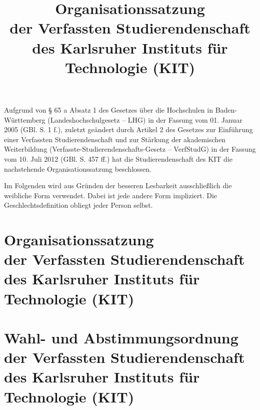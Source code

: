 \documentclass[
	a4paper,
	parskip=half,
	numbers=noenddot,
	titlepage,
	DIV=12,
]{scrartcl}
\title{Organisationssatzung \\ der Verfassten Studierendenschaft \\ des Karlsruher Instituts für Technologie (KIT)}
\author{}
\date{}
\begin{document}
\maketitle

\cleardoublepage

\begin{multicols}{2}
\tableofcontents
\end{multicols}

\bigskip

Aufgrund von § 65 a Absatz 1 des Gesetzes über die Hochschulen in Baden-Württemberg (Landeshochschulgesetz -- LHG) in der Fassung vom 01. Januar 2005 (GBl. S. 1 f.), zuletzt geändert durch Artikel 2 des Gesetzes zur Einführung einer Verfassten Studierendenschaft und zur Stärkung der akademischen Weiterbildung (Verfasste-Studierendenschafts-Gesetz -- VerfStudG) in der Fassung vom 10. Juli 2012 (GBl. S. 457 ff.) hat die Studierendenschaft des KIT die nachstehende Organisationssatzung beschlossen.

Im Folgenden wird aus Gründen der besseren Lesbarkeit ausschließlich die weibliche Form verwendet. Dabei ist jede andere Form impliziert. Die Geschlechtsdefinition obliegt jeder Person selbst.




\part[Organisationssatzung]{Organisationssatzung \\ der Verfassten Studierendenschaft \\ des Karlsruher Instituts für Technologie (KIT)}

\begin{multicols}{2}

\end{multicols}


\part[Wahl- und Abstimmungsordnung]{Wahl- und Abstimmungsordnung \\ der Verfassten Studierendenschaft \\ des Karlsruher Instituts für Technologie (KIT)}

\begin{multicols}{2}

\end{multicols}
\end{document}
